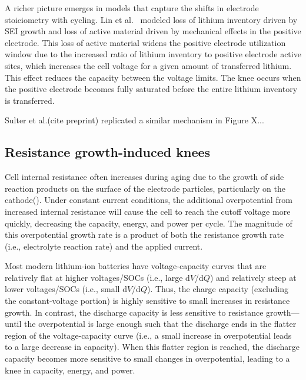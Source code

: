 \documentclass[journal=jpclcd,manuscript=article]{achemso}
\begin{document}
A richer picture emerges in models that capture the shifts in electrode stoiciometry with cycling. Lin et al.~\cite{lin_comprehensive_2013} modeled loss of lithium inventory driven by SEI growth and loss of active material driven by mechanical effects in the positive electrode. This loss of active material widens the positive electrode utilization window due to the increased ratio of lithium inventory to positive electrode active sites, which increases the cell voltage for a given amount of transferred lithium. This effect reduces the capacity between the voltage limits. The knee occurs when the positive electrode becomes fully saturated before the entire lithium inventory is transferred.

Sulter et al.(cite preprint) replicated a similar mechanism in Figure X...

\subsection{Resistance growth-induced knees}

Cell internal resistance often increases during aging due to the growth of side reaction products on the surface of the electrode particles, particularly on the cathode(). Under constant current conditions, the additional overpotential from increased internal resistance will cause the cell to reach the cutoff voltage more quickly, decreasing the capacity, energy, and power per cycle. The magnitude of this overpotential growth rate is a product of both the resistance growth rate (i.e., electrolyte reaction rate) and the applied current.

Most modern lithium-ion batteries have voltage-capacity curves that are relatively flat at higher voltages/SOCs (i.e., large d$V$/d$Q$) and relatively steep at lower voltages/SOCs (i.e., small d$V$/d$Q$). Thus, the charge capacity (excluding the constant-voltage portion) is highly sensitive to small increases in resistance growth. In contrast, the discharge capacity is less sensitive to resistance growth---until the overpotential is large enough such that the discharge ends in the flatter region of the voltage-capacity curve (i.e., a small increase in overpotential leads to a large decrease in capacity). When this flatter region is reached, the discharge capacity becomes more sensitive to small changes in overpotential, leading to a knee in capacity, energy, and power.
\end{document}
